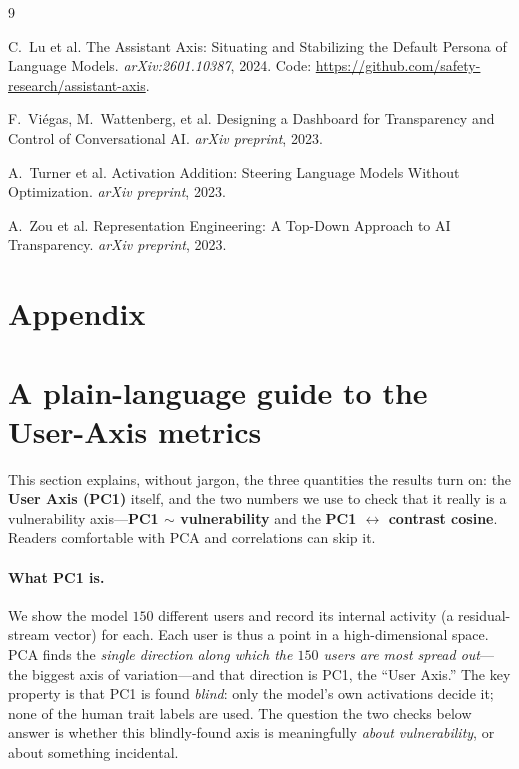 \documentclass{article}
\begin{document}

\begin{thebibliography}{9}
\providecommand{\natexlab}[1]{#1}

C.~Lu et al.
\newblock The Assistant Axis: Situating and Stabilizing the Default Persona of
Language Models.
\newblock \emph{arXiv:2601.10387}, 2024.
\newblock Code: \url{https://github.com/safety-research/assistant-axis}.

F.~Vi\'egas, M.~Wattenberg, et al.
\newblock Designing a Dashboard for Transparency and Control of Conversational AI.
\newblock \emph{arXiv preprint}, 2023.

A.~Turner et al.
\newblock Activation Addition: Steering Language Models Without Optimization.
\newblock \emph{arXiv preprint}, 2023.

A.~Zou et al.
\newblock Representation Engineering: A Top-Down Approach to AI Transparency.
\newblock \emph{arXiv preprint}, 2023.
\end{thebibliography}

\appendix
\newpage
\section*{\centering Appendix}

\section{A plain-language guide to the User-Axis metrics}\label{app:primer}
This section explains, without jargon, the three quantities the results turn on:
the \textbf{User Axis (PC1)} itself, and the two numbers we use to check that it
really is a vulnerability axis---\textbf{PC1 $\sim$ vulnerability} and the
\textbf{PC1 $\leftrightarrow$ contrast cosine}. Readers comfortable with PCA and
correlations can skip it.

\paragraph{What PC1 is.} We show the model $150$ different users and record its
internal activity (a residual-stream vector) for each. Each user is thus a point
in a high-dimensional space. PCA finds the \emph{single direction along which the
$150$ users are most spread out}---the biggest axis of variation---and that
direction is PC1, the ``User Axis.'' The key property is that PC1 is found
\emph{blind}: only the model's own activations decide it; none of the human trait
labels are used. The question the two checks below answer is whether this
blindly-found axis is meaningfully \emph{about vulnerability}, or about something
incidental.
\end{document}
